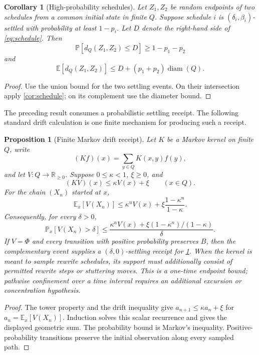 \documentclass[11pt]{article}
\newtheorem{proposition}[theorem]{Proposition}
\newtheorem{corollary}[theorem]{Corollary}
\theoremstyle{definition}
\theoremstyle{remark}
\numberwithin{equation}{section}
\newcommand{\diam}{\operatorname{diam}}
\begin{document}
\begin{corollary}[High-probability schedules]\label{cor:probabilistic}
Let $Z_1,Z_2$ be random endpoints of two schedules from a common initial state in finite $Q$.  Suppose schedule $i$ is $(\delta_i,\beta_i)$-settled with probability at least $1-p_i$.  Let $D$ denote the right-hand side of \eqref{eq:schedule}.  Then
\[
 \mathbb P[d_Q(Z_1,Z_2)\le D]\ge1-p_1-p_2
\]
and
\[
 \mathbb E[d_Q(Z_1,Z_2)]
 \le D+(p_1+p_2)\diam(Q).
\]
\end{corollary}

\begin{proof}
Use the union bound for the two settling events.  On their intersection apply \cref{cor:schedule}; on its complement use the diameter bound.
\end{proof}

The preceding result consumes a probabilistic settling receipt.  The following
standard drift calculation is one finite mechanism for producing such a
receipt.

\begin{proposition}[Finite Markov drift receipt]\label{prop:markov-receipt}
Let $K$ be a Markov kernel on finite $Q$, write
\[
 (Kf)(x)=\sum_{y\in Q}K(x,y)f(y),
\]
and let $V:Q\to\mathbb R_{\ge0}$.  Suppose $0\le\kappa<1$,
$\xi\ge0$, and
\[
 (KV)(x)\le\kappa V(x)+\xi
 \qquad(x\in Q).
\]
For the chain $(X_n)$ started at $x$,
\[
 \mathbb E_x[V(X_n)]
 \le
 \kappa^nV(x)+
 \xi\frac{1-\kappa^n}{1-\kappa}.
\]
Consequently, for every $\delta>0$,
\[
 \mathbb P_x[V(X_n)>\delta]
 \le
 \frac{\kappa^nV(x)+
 \xi(1-\kappa^n)/(1-\kappa)}{\delta}.
\]
If $V=\Phi$ and every transition with positive probability preserves $B$,
then the complementary event supplies a $(\delta,0)$-settling receipt for
\cref{cor:probabilistic}.  When the kernel is meant to sample rewrite
schedules, its support must additionally consist of permitted rewrite steps
or stuttering moves.  This is a one-time endpoint bound; pathwise confinement
over a time interval requires an additional excursion or concentration
hypothesis.
\end{proposition}

\begin{proof}
The tower property and the drift inequality give
$a_{n+1}\le\kappa a_n+\xi$ for
$a_n=\mathbb E_x[V(X_n)]$.  Induction solves this scalar recurrence and
gives the displayed geometric sum.  The probability bound is Markov's
inequality.  Positive-probability transitions preserve the initial
observation along every sampled path.
\end{proof}
\end{document}
